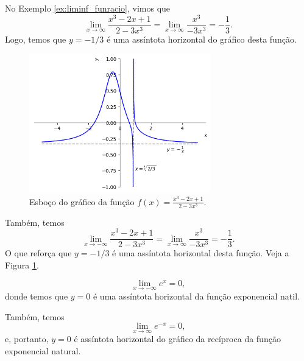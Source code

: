\begin{ex}\label{ex:ass_hor}
  No Exemplo \ref{ex:liminf_funracio}, vimos que
  \begin{equation}
    \lim_{x\to\infty} \frac{x^3 - 2x + 1}{2 - 3x^3} = \lim_{x\to\infty} \frac{x^3}{-3x^3} = -\frac{1}{3}.
  \end{equation}
  Logo, temos que $y=-1/3$ é uma assíntota horizontal do gráfico desta função.

      \begin{figure}[H]
      \centering
      \includegraphics[width=0.7\textwidth]{./cap_lim/dados/fig_ex_ass/fig_ex_ass}
      \caption{Esboço do gráfico da função $\displaystyle f(x) = \frac{x^3 - 2x + 1}{2 - 3x^3}$.}
      \label{fig:ex_ass}
    \end{figure}


  Também, temos
  \begin{equation}
    \lim_{x\to -\infty} \frac{x^3 - 2x + 1}{2 - 3x^3} = \lim_{x\to\infty} \frac{x^3}{-3x^3} = -\frac{1}{3}.
  \end{equation}
  O que reforça que $y = -1/3$ é uma assíntota horizontal desta função. Veja a Figura \ref{fig:ex_ass}.
\end{ex}

\begin{ex}
  \begin{equation}
    \lim_{x\to -\infty} e^x = 0,
  \end{equation}
  donde temos que $y=0$ é uma assíntota horizontal da função exponencial natil.

  Também, temos
  \begin{equation}
    \lim_{x\to \infty} e^{-x} = 0,
  \end{equation}
  e, portanto, $y=0$ é assíntota horizontal do gráfico da recíproca da função exponencial natural.
\end{ex}

